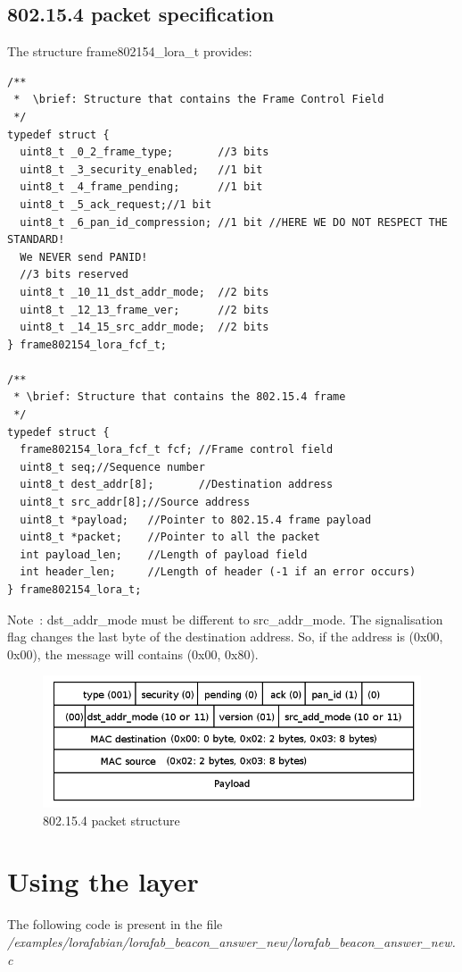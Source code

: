 \documentclass{article}
\begin{document}
\subsection{802.15.4 packet specification}
The structure frame802154\_lora\_t provides:
\begin{verbatim}
/**
 *  \brief: Structure that contains the Frame Control Field
 */
typedef struct {
  uint8_t _0_2_frame_type;       //3 bits
  uint8_t _3_security_enabled;   //1 bit
  uint8_t _4_frame_pending;      //1 bit
  uint8_t _5_ack_request;//1 bit
  uint8_t _6_pan_id_compression; //1 bit //HERE WE DO NOT RESPECT THE STANDARD! 
  We NEVER send PANID!
  //3 bits reserved
  uint8_t _10_11_dst_addr_mode;  //2 bits
  uint8_t _12_13_frame_ver;      //2 bits
  uint8_t _14_15_src_addr_mode;  //2 bits
} frame802154_lora_fcf_t;

/**
 * \brief: Structure that contains the 802.15.4 frame
 */
typedef struct {
  frame802154_lora_fcf_t fcf; //Frame control field
  uint8_t seq;//Sequence number
  uint8_t dest_addr[8];       //Destination address
  uint8_t src_addr[8];//Source address
  uint8_t *payload;   //Pointer to 802.15.4 frame payload
  uint8_t *packet;    //Pointer to all the packet
  int payload_len;    //Length of payload field
  int header_len;     //Length of header (-1 if an error occurs)
} frame802154_lora_t;
\end{verbatim}
Note~: dst\_addr\_mode must be different to src\_addr\_mode. The signalisation flag changes the last byte of the destination address. So, if the address is (0x00, 0x00), the message will contains (0x00, 0x80).\\
\begin{figure}[h]
	\begin{center}
		\includegraphics[scale=0.5]{img/trame}
		\caption{802.15.4 packet structure}
		\label{fig:trame802154}
	\end{center}
\end{figure}
\section{Using the layer}
The following code is present in the file \\
\emph{/examples/lorafabian/lorafab\_beacon\_answer\_new/lorafab\_beacon\_answer\_new.c}
\end{document}
